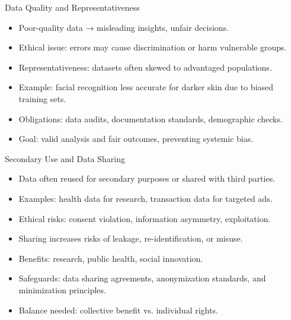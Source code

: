 \documentclass[aspectratio=169, table]{beamer}
\begin{document}
\begin{frame}{Data Quality and Representativeness}
	\vspace{20pt}
	\begin{itemize}
		\item Poor-quality data → misleading insights, unfair decisions.  
		\item Ethical issue: errors may cause discrimination or harm vulnerable groups.  
		\item Representativeness: datasets often skewed to advantaged populations.  
		\item Example: facial recognition less accurate for darker skin due to biased training sets.  
		\item Obligations: data audits, documentation standards, demographic checks.  
		\item Goal: valid analysis and fair outcomes, preventing systemic bias.  
	\end{itemize}
\end{frame}

\begin{frame}{Secondary Use and Data Sharing}
	\vspace{20pt}
	\begin{itemize}
		\item Data often reused for secondary purposes or shared with third parties.  
		\item Examples: health data for research, transaction data for targeted ads.  
		\item Ethical risks: consent violation, information asymmetry, exploitation.  
		\item Sharing increases risks of leakage, re-identification, or misuse.  
		\item Benefits: research, public health, social innovation.  
		\item Safeguards: data sharing agreements, anonymization standards, and minimization principles.  
		\item Balance needed: collective benefit vs. individual rights.  
	\end{itemize}
\end{frame}
\end{document}
